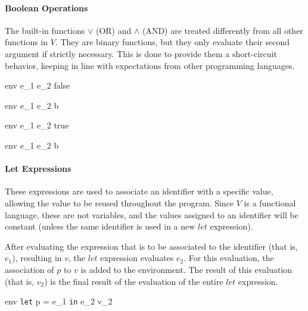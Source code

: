\documentclass{article}
\begin{document}
\paragraph{Boolean Operations}\label{BoolOPEval}

The built-in functions $\vee$ (OR) and $\wedge$ (AND) are treated differently from all other functions in $V$.
They are binary functions, but they only evaluate their second argument if strictly necessary.
This is done to provide them a short-circuit behavior, keeping in line with expectations from other programming languages.

    {\mbox{env} \vdash e_1 \; e_2 \Downarrow false}

    {\mbox{env} \vdash e_1 \; e_2 \Downarrow b}

    {\mbox{env} \vdash e_1 \; e_2 \Downarrow true}

    {\mbox{env} \vdash e_1 \; e_2 \Downarrow b}

\paragraph{Let Expressions}
These expressions are used to associate an identifier with a specific value, allowing the value to be reused throughout the program.
Since $V$ is a functional language, these are not variables, and the values assigned to an identifier will be constant (unless the same identifier is used in a new $let$ expression).

After evaluating the expression that is to be associated to the identifier (that is, $e_1$), resulting in $v$, the $let$ expression evaluates $e_2$.
For this evaluation, the association of $p$ to $v$ is added to the environment.
The result of this evaluation (that is, $v_2$) is the final result of the evaluation of the entire $let$ expression.

    {\mbox{env} \vdash \texttt{let} \; p = e_1 \; \texttt{in} \; e_2 \Downarrow v_2}
\end{document}
